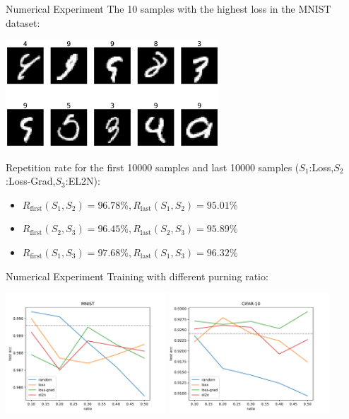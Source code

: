 \documentclass{ctexbeamer}
\begin{document}
\begin{frame}{Numerical Experiment}
    The 10 samples with the highest loss in the MNIST dataset:
    \begin{center}
        \includegraphics[width=0.6\textwidth]{../images/mnist_hard_samples.pdf}
    \end{center}
    
    Repetition rate for the first 10000 samples and last 10000 samples (\(S_1\):Loss,\(S_2\):Loss-Grad,\(S_3\):EL2N):
    \begin{itemize}
        \item \(R_{\text{first} }(S_1,S_2)=96.78\%,R_{\text{last} }(S_1,S_2)=95.01\%\)
        \item \(R_{\text{first} }(S_2,S_3)=96.45\%,R_{\text{last} }(S_2,S_3)=95.89\%\)
        \item \(R_{\text{first} }(S_1,S_3)=97.68\%,R_{\text{last} }(S_1,S_3)=96.32\%\)
    \end{itemize}
\end{frame}

\begin{frame}{Numerical Experiment}
    Training with different purning ratio:
    \begin{center}
        \includegraphics[width=0.45\textwidth]{../images/mnist_ratio.pdf}
        \includegraphics[width=0.45\textwidth]{../images/cifar10_ratio.pdf}
    \end{center}
\end{frame}
\end{document}
